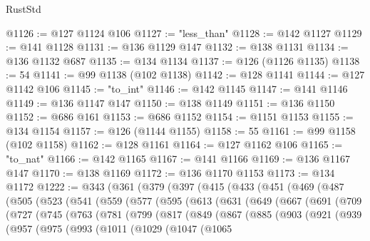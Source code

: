 \begin{lexlean}{RustStd}
\begin{coremodule}
@1126 := @127 @1124 @106
@1127 := "less_than"
@1128 := @142 @1127
@1129 := @141 @1128
@1131 := @136 @1129 @147
@1132 := @138 @1131
@1134 := @136 @1132 @687
@1135 := @134 @1134
@1137 := @126 (@1126 @1135)
@1138 := 54
@1141 := @99 @1138 (@102 @1138)
@1142 := @128 @1141
@1144 := @127 @1142 @106
@1145 := "to_int"
@1146 := @142 @1145
@1147 := @141 @1146
@1149 := @136 @1147 @147
@1150 := @138 @1149
@1151 := @136 @1150
@1152 := @686 @161
@1153 := @686 @1152
@1154 := @1151 @1153
@1155 := @134 @1154
@1157 := @126 (@1144 @1155)
@1158 := 55
@1161 := @99 @1158 (@102 @1158)
@1162 := @128 @1161
@1164 := @127 @1162 @106
@1165 := "to_nat"
@1166 := @142 @1165
@1167 := @141 @1166
@1169 := @136 @1167 @147
@1170 := @138 @1169
@1172 := @136 @1170 @1153
@1173 := @134 @1172
@1222 := @343
    (@361
      (@379
        (@397
          (@415
            (@433
              (@451
                (@469
                  (@487
                    (@505
                      (@523
                        (@541
                          (@559
                            (@577
                              (@595
                                (@613
                                  (@631
                                    (@649
                                      (@667
                                        (@691
                                          (@709
                                            (@727
                                              (@745
                                                (@763
                                                  (@781
                                                    (@799
                                                      (@817
                                                        (@849
                                                          (@867
                                                            (@885
                                                              (@903
                                                                (@921
                                                                  (@939
                                                                    (@957
                                                                      (@975
                                                                        (@993
                                                                          (@1011
                                                                            (@1029
                                                                              (@1047
                                                                                (@1065

\end{coremodule}
\end{lexlean}
